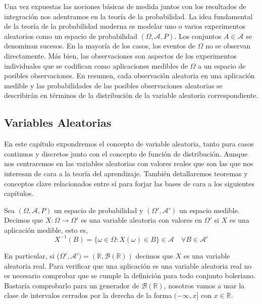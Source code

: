     Una vez expuestas las nociones básicas de medida juntos con los resultados de integración nos adentramos en la teoría de la probabilidad. La idea fundamental de la teoría de la probabilidad moderna es modelar uno o varios experimentos aleatorios como un espacio de probabilidad $(\Omega,\mathcal{A},P)$. Los conjuntos $A \in \mathcal{A}$ se denominan sucesos. En la mayoría de los casos, los eventos de $\Omega$ no se observan directamente. Más bien, las observaciones son aspectos de los experimentos individuales que se codifican como aplicaciones medibles de $\Omega$ a un espacio de posibles observaciones. En resumen, cada observación aleatoria en una aplicación medible y las probabilidades de las posibles observaciones aleatorias se describirán en términos de la distribución de la variable aleatoria correspondiente.\\
    

\subsection{Variables Aleatorias}

    En este capítulo expondremos el concepto de variable aleatoria, tanto para casos continuos y discretos junto con el concepto de función de distribución. Aunque nos centraremos en las variables aleatorias con valores reales que son las que nos interesan de cara a la teoría del aprendizaje. También detallaremos teoremas y conceptos clave relacionados entre sí para forjar las bases de cara a los siguientes capítulos.\\
    
    
        \begin{definicion}\label{def:VA}
            Sea $(\Omega, \mathcal{A},P)$ un espacio de probabilidad y $(\Omega',\mathcal{A}')$ un espacio medible. Decimos que $X:\Omega \to \Omega'$ es una variable aleatoria con valores en $\Omega'$ si $X$ es una aplicación medible, esto es,
            \begin{equation}\label{eq:defVA}
            X^{-1}(B) = \{\omega \in \Omega: X(\omega) \in B\} \in  \mathcal{A} \quad \forall B \in \mathcal{A}'
            \end{equation}
        \end{definicion}        
        
    
    En particular, si ($\Omega',\mathcal{A}') = (\mathbb{R},\mathcal{B}(\mathbb{R}))$ decimos que $X$ es una variable aleatoria real. Para verificar que una aplicación es una variable aleatoria real no es necesario comprobar que se cumple la definición para todo conjunto boleriano. Bastaría comprobarlo para un generador de $\mathcal{B}(\mathbb{R})$, nosotros vamos a usar la clase de intervalos cerrados por la derecha de la forma $(-\infty,x]$ con $x \in \mathbb{R}$. \\
    
